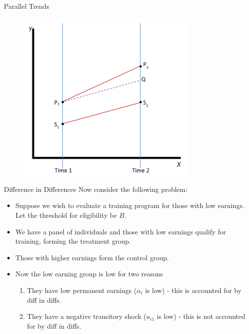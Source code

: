 \begin{frame}{Parallel Trends}
\begin{figure}
\centering
\includegraphics[width=3.5in]{./resources/parallel-trends}
\end{figure}
\end{frame}

\begin{frame}{Difference in Differences}
Now consider the following problem:
\begin{itemize}
\item Suppose we wish to evaluate a training program for those with low
earnings. Let the threshold for eligibility be $B$.
\item We have a panel of individuals and those with low earnings qualify for
training, forming the treatment group.
\item Those with higher earnings form the control group. 
\item Now the low earning group is low for two reasons
\begin{enumerate}
\item They have low permanent earnings ($\alpha_i$ is low) - this is accounted for by diff in diffs.
\item They have a negative transitory shock ($u_{i1}$ is low) - this is not accounted for by diff in diffs.
\end{enumerate} 
\end{itemize}
\end{frame} 

